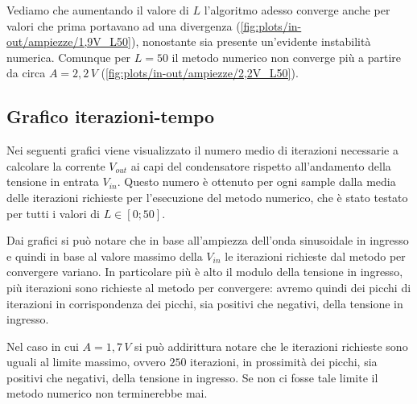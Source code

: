 			\graficospace
			
			Vediamo che aumentando il valore di $L$ l'algoritmo adesso converge anche per valori che prima portavano ad una divergenza (\ref{fig:plots/in-out/ampiezze/1,9V_L50}), nonostante sia presente un'evidente instabilità numerica. Comunque per $L = 50$ il metodo numerico non converge più a partire da circa $A = 2,2\,V$ (\ref{fig:plots/in-out/ampiezze/2,2V_L50}).
			\pagebreak
		
		\subsection{Grafico iterazioni-tempo}
			\label{graphs:iterazioni-tempo}
			Nei seguenti grafici viene visualizzato il numero medio di iterazioni necessarie a calcolare la corrente $V_{out}$ ai capi del condensatore rispetto all'andamento della tensione in entrata $V_{in}$. Questo numero è ottenuto per ogni sample dalla media delle iterazioni richieste per l'esecuzione del metodo numerico, che è stato testato per tutti i valori di $L \in [0; 50]$. 

			\graficospace
			\graficospace
			\graficospace
			\graficospace
			
			Dai grafici si può notare che in base all'ampiezza dell'onda sinusoidale in ingresso e quindi in base al valore massimo della $V_{in}$ le iterazioni richieste dal metodo per convergere variano. In particolare più è alto il modulo della tensione in ingresso, più iterazioni sono richieste al metodo per convergere: avremo quindi dei picchi di iterazioni in corrispondenza dei picchi, sia positivi che negativi, della tensione in ingresso.
			
			Nel caso in cui $A = 1,7\,V$ si può addirittura notare che le iterazioni richieste sono uguali al limite massimo, ovvero $250$ iterazioni, in prossimità dei picchi, sia positivi che negativi, della tensione in ingresso. Se non ci fosse tale limite il metodo numerico non terminerebbe mai.
			\pagebreak
		
